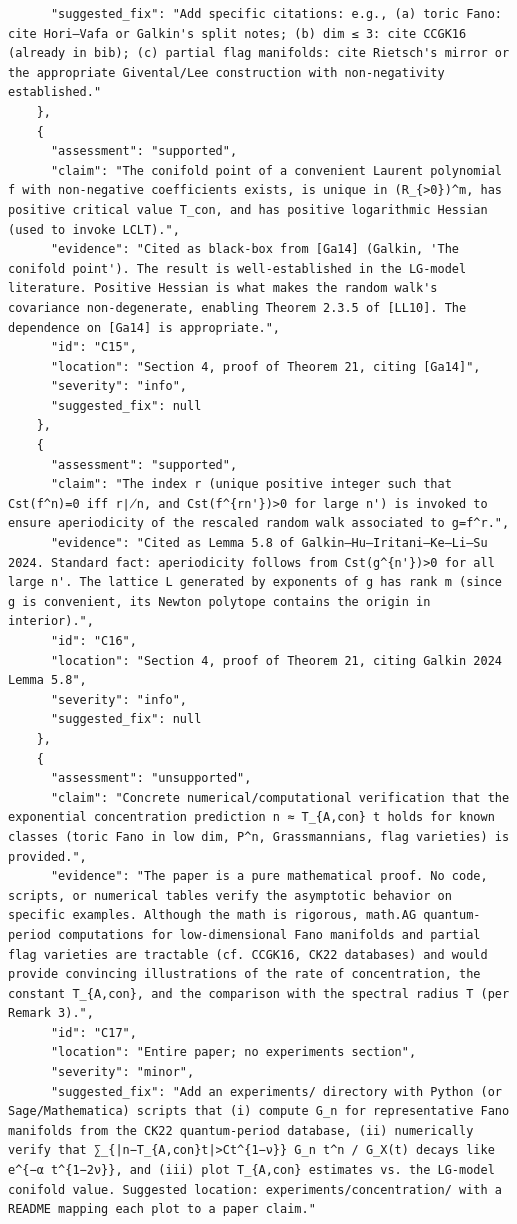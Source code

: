 \documentclass[11pt]{article}
\begin{document}
\begin{verbatim}
      "suggested_fix": "Add specific citations: e.g., (a) toric Fano: cite Hori–Vafa or Galkin's split notes; (b) dim ≤ 3: cite CCGK16 (already in bib); (c) partial flag manifolds: cite Rietsch's mirror or the appropriate Givental/Lee construction with non-negativity established."
    },
    {
      "assessment": "supported",
      "claim": "The conifold point of a convenient Laurent polynomial f with non-negative coefficients exists, is unique in (R_{>0})^m, has positive critical value T_con, and has positive logarithmic Hessian (used to invoke LCLT).",
      "evidence": "Cited as black-box from [Ga14] (Galkin, 'The conifold point'). The result is well-established in the LG-model literature. Positive Hessian is what makes the random walk's covariance non-degenerate, enabling Theorem 2.3.5 of [LL10]. The dependence on [Ga14] is appropriate.",
      "id": "C15",
      "location": "Section 4, proof of Theorem 21, citing [Ga14]",
      "severity": "info",
      "suggested_fix": null
    },
    {
      "assessment": "supported",
      "claim": "The index r (unique positive integer such that Cst(f^n)=0 iff r∤n, and Cst(f^{rn'})>0 for large n') is invoked to ensure aperiodicity of the rescaled random walk associated to g=f^r.",
      "evidence": "Cited as Lemma 5.8 of Galkin–Hu–Iritani–Ke–Li–Su 2024. Standard fact: aperiodicity follows from Cst(g^{n'})>0 for all large n'. The lattice L generated by exponents of g has rank m (since g is convenient, its Newton polytope contains the origin in interior).",
      "id": "C16",
      "location": "Section 4, proof of Theorem 21, citing Galkin 2024 Lemma 5.8",
      "severity": "info",
      "suggested_fix": null
    },
    {
      "assessment": "unsupported",
      "claim": "Concrete numerical/computational verification that the exponential concentration prediction n ≈ T_{A,con} t holds for known classes (toric Fano in low dim, P^n, Grassmannians, flag varieties) is provided.",
      "evidence": "The paper is a pure mathematical proof. No code, scripts, or numerical tables verify the asymptotic behavior on specific examples. Although the math is rigorous, math.AG quantum-period computations for low-dimensional Fano manifolds and partial flag varieties are tractable (cf. CCGK16, CK22 databases) and would provide convincing illustrations of the rate of concentration, the constant T_{A,con}, and the comparison with the spectral radius T (per Remark 3).",
      "id": "C17",
      "location": "Entire paper; no experiments section",
      "severity": "minor",
      "suggested_fix": "Add an experiments/ directory with Python (or Sage/Mathematica) scripts that (i) compute G_n for representative Fano manifolds from the CK22 quantum-period database, (ii) numerically verify that ∑_{|n−T_{A,con}t|>Ct^{1−ν}} G_n t^n / G_X(t) decays like e^{−α t^{1−2ν}}, and (iii) plot T_{A,con} estimates vs. the LG-model conifold value. Suggested location: experiments/concentration/ with a README mapping each plot to a paper claim."

\end{verbatim}
\end{document}
